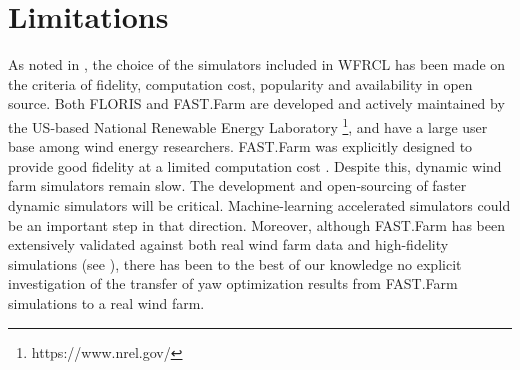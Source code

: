 \documentclass{article}
\begin{document}
\section{Limitations}\label{section:discussion}
As noted in , the choice of the simulators included in WFRCL has been made on the criteria of fidelity, computation cost, popularity and availability in open source. Both FLORIS and FAST.Farm are developed and actively maintained by the US-based National Renewable Energy Laboratory \footnote{https://www.nrel.gov/}, and have a large user base among wind energy researchers. FAST.Farm was explicitly designed to provide good fidelity at a limited computation cost \cite{fast.farm}. Despite this, dynamic wind farm simulators remain slow. The development and open-sourcing of faster dynamic simulators will be critical. Machine-learning accelerated simulators could be an important step in that direction.
Moreover, although FAST.Farm has been extensively validated against both real wind farm data and high-fidelity simulations (see ), there has been to the best of our knowledge no explicit investigation of the transfer of yaw optimization results from FAST.Farm simulations to a real wind farm.
%
\end{document}
